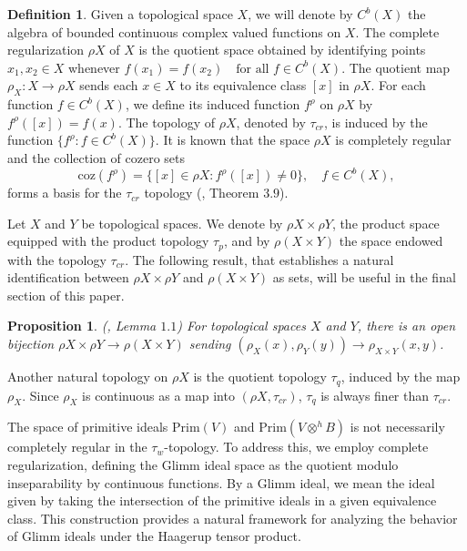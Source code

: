 \documentclass{birkjour}
\newtheorem{prop}[thm]{Proposition}
\theoremstyle{definition}
\newtheorem{defn}[thm]{Definition}
\theoremstyle{remark}
\numberwithin{equation}{section}
\begin{document}
\begin{defn}
    Given a topological space $X$, we will denote by $C^b(X)$ the algebra of bounded continuous complex valued functions on $X$. The complete regularization $\rho X$ of $X$ is the quotient space obtained by identifying points $x_1, x_2 \in X$ whenever  $f(x_1) = f(x_2) \quad \text{for all }  f \in C^b(X)$. The quotient map $\rho_X: X \to \rho X$ sends each $x \in X$ to its equivalence class $[x]$ in $\rho X$. For each function $f \in C^b(X)$, we define its induced function $f^\rho$ on $\rho X$ by  $f^\rho([x]) = f(x)$. The topology of $\rho X$, denoted by $\tau_{cr}$, is induced by the function $\{f^{\rho}: f \in C^b(X) \}$. It is known that the space $\rho X$ is completely regular and the collection of cozero sets  
\[
\mathrm{coz}(f^\rho) = \{ [x] \in \rho X : f^\rho([x]) \neq 0 \}, \quad f \in C^b(X),
\]  
forms a basis for the $\tau_{cr}$ topology (\cite{rings}, Theorem $3.9$). 
\end{defn}

Let $X$ and $Y$ be topological spaces. We denote by $\rho X \times \rho Y$, the product space equipped with the product topology $\tau_p$, and by $\rho (X \times Y)$ the space endowed with the topology $\tau_{cr}$. The following result, that establishes a natural identification between $\rho X \times \rho Y$ and $\rho (X \times Y)$ as sets, will be useful in the final section of this paper. 

\begin{prop}
    (\cite{Glimm}, Lemma $1.1$) For topological spaces $X$ and $Y$, there is an open bijection $\rho X \times \rho Y \to \rho (X \times Y)$ sending $(\rho_X(x), \rho_Y(y)) \to \rho_{X \times Y}(x, y)$.
\end{prop}

Another natural topology on $\rho X$ is the quotient topology $\tau_q$, induced by the map $\rho_X$. Since $\rho_X$ is continuous as a map into $(\rho X, \tau_{cr})$, $\tau_q$ is always finer than $\tau_{cr}$. 







The space of primitive ideals $\mathrm{Prim}(V)$ and $\mathrm{Prim}(V \otimes^h B)$ is not necessarily completely regular in the $\tau_w$-topology. To address this, we employ complete regularization, defining the Glimm ideal space as the quotient modulo inseparability by continuous functions. By a Glimm ideal, we mean the ideal given by taking the intersection of the primitive ideals in a given equivalence class. This construction provides a natural framework for analyzing the behavior of Glimm ideals under the Haagerup tensor product. 
 
\end{document}
